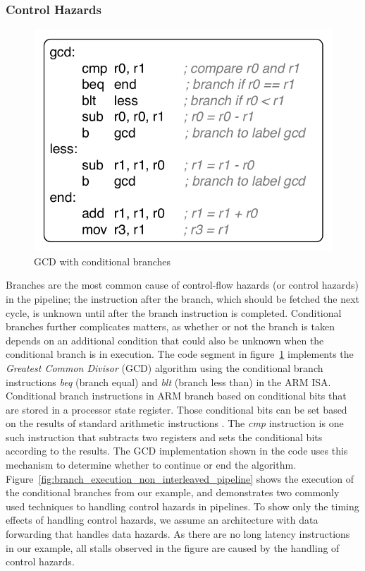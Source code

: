 \subsubsection{Control Hazards}
\begin{figure}
  \vspace{-20pt}
  \begin{center}
    \includegraphics[scale=.65]{figs/sample_gcd_code}
  \end{center}
  \vspace{-3mm}
  \caption{GCD with conditional branches}
  \label{fig:sample_gcd_code}
\end{figure}

Branches are the most common cause of control-flow hazards (or control hazards) in the pipeline; the instruction after the branch, which should be fetched the next cycle, is unknown until after the branch instruction is completed.
Conditional branches further complicates matters, as whether or not the branch is taken depends on an additional condition that could also be unknown when the conditional branch is in execution. 
The code segment in figure~\ref{fig:sample_gcd_code} implements the \emph{Greatest Common Divisor} (GCD) algorithm using the conditional branch instructions \emph{beq} (branch equal) and \emph{blt} (branch less than) in the ARM ISA.  
Conditional branch instructions in ARM branch based on conditional bits that are stored in a processor state register.
Those conditional bits can be set based on the results of standard arithmetic instructions .
The \emph{cmp} instruction is one such instruction that subtracts two registers and sets the conditional bits according to the results.
The GCD implementation shown in the code uses this mechanism to determine whether to continue or end the algorithm.
Figure~\ref{fig:branch_execution_non_interleaved_pipeline} shows the execution of the conditional branches from our example, and demonstrates two commonly used techniques to handling control hazards in pipelines. 
To show only the timing effects of handling control hazards, we assume an architecture with data forwarding that handles data hazards.
As there are no long latency instructions in our example, all stalls observed in the figure are caused by the handling of control hazards.  

